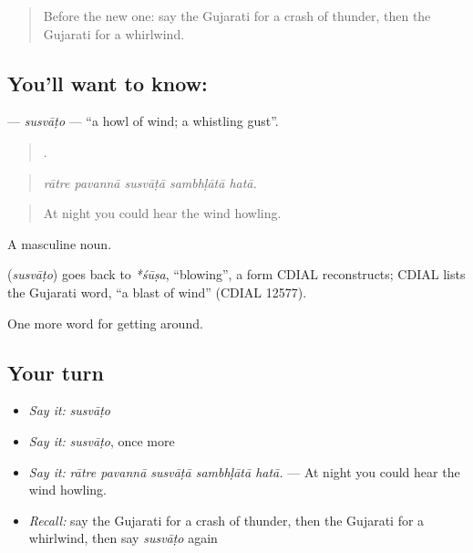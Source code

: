 \label{lesson:GU-C435-susvato}



\begin{quote}
Before the new one: say the Gujarati for a crash of thunder, then the Gujarati for a whirlwind.
\end{quote}

\subsection*{You'll want to know: }
\textbf{} — \emph{susvāṭo} — \textquotedblleft{}a howl of wind; a whistling gust\textquotedblright{}.

\begin{quote}
    .
\end{quote}

\begin{quote}
\emph{rātre pavannā susvāṭā sambhḷātā hatā.}
\end{quote}

\begin{quote}
At night you could hear the wind howling.
\end{quote}

A masculine noun.

\begin{cousinweb}
\textbf{} (\emph{susvāṭo}) goes back to \emph{*śūṣa}, \textquotedblleft{}blowing\textquotedblright{}, a form CDIAL reconstructs; CDIAL lists the Gujarati word, \textquotedblleft{}a blast of wind\textquotedblright{} (CDIAL 12577).
\end{cousinweb}

\begin{grammarlens}[title={What you've built}]
One more word for getting around.
\end{grammarlens}

\subsection*{Your turn}
\begin{itemize}
\raggedright
  \item \emph{Say it:} \emph{susvāṭo}
  \item \emph{Say it:} \emph{susvāṭo}, once more
  \item \emph{Say it:} \emph{rātre pavannā susvāṭā sambhḷātā hatā.} — At night you could hear the wind howling.
  \item \emph{Recall:} say the Gujarati for a crash of thunder, then the Gujarati for a whirlwind, then say \emph{susvāṭo} again
\end{itemize}

